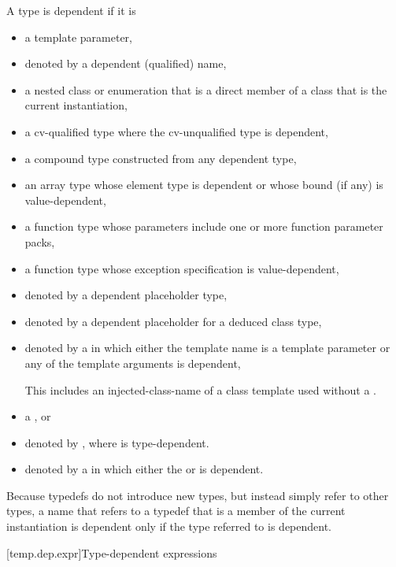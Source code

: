 \pnum
A type is dependent if it is
\begin{itemize}
\item
a template parameter,
\item
denoted by a dependent (qualified) name,
\item
a nested class or enumeration that is a direct member of
a class that is the current instantiation,
\item
a cv-qualified type where the cv-unqualified type is dependent,
\item
a compound type constructed from any dependent type,
\item
an array type whose element type is dependent or whose
bound (if any) is value-dependent,
\item
a function type whose parameters include one or more function parameter packs,
\item
a function type whose exception specification is value-dependent,
\item
denoted by a dependent placeholder type,
\item
denoted by a dependent placeholder for a deduced class type,
\item
denoted by a 
in which either the template name is a template parameter or any of the
template arguments is dependent,
\begin{footnote}
This includes an injected-class-name of a class template
used without a .
\end{footnote}
\item a , or
\item denoted by \tcode{)},
where  is type-dependent.
\item denoted by a  in which either
the  or
is dependent.
\end{itemize}

\pnum
\begin{note}
Because typedefs do not introduce new types, but
instead simply refer to other types, a name that refers to a
typedef that is a member of the current instantiation is dependent
only if the type referred to is dependent.
\end{note}

[temp.dep.expr]{Type-dependent expressions}

